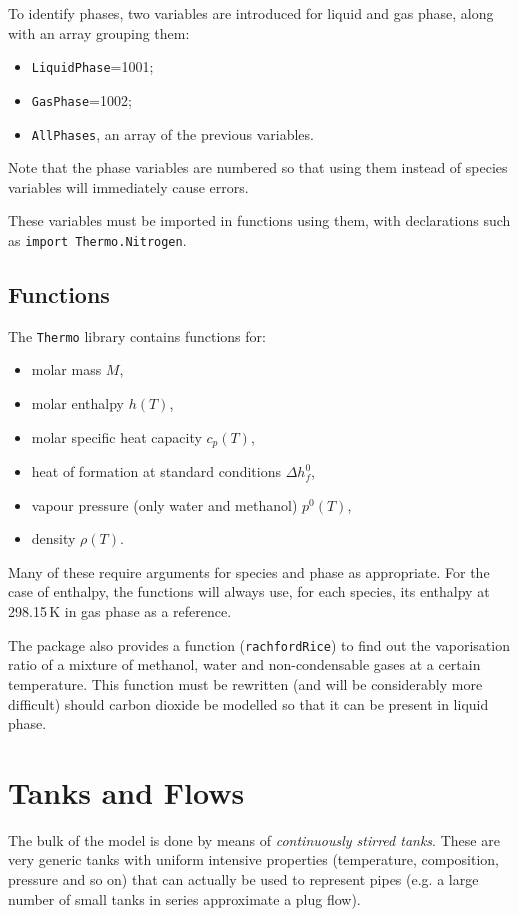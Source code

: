 \documentclass[a4paper]{article}
\begin{document}
To identify phases, two variables are introduced for liquid and gas phase, along
with an array grouping them:

\begin{itemize}
\item \texttt{LiquidPhase}=1001;
\item \texttt{GasPhase}=1002;
\item \texttt{AllPhases}, an array of the previous variables.
\end{itemize}

Note that the phase variables are numbered so that using them instead of species
variables will immediately cause errors.

These variables must be imported in functions using them, with declarations such
as \texttt{import Thermo.Nitrogen}.

\subsection{Functions}
The \texttt{Thermo} library contains functions for:

\begin{itemize}
\item molar mass $M$,
\item molar enthalpy $h(T)$,
\item molar specific heat capacity $c_p(T)$,
\item heat of formation at standard conditions $\Delta h_f^0$,
\item vapour pressure (only water and methanol) $p^0(T)$,
\item density $\rho(T)$.
\end{itemize}

Many of these require arguments for species and phase as appropriate. For the
case of enthalpy, the functions will always use, for each species, its enthalpy
at 298.15\,K in gas phase as a reference.

The package also provides a function (\texttt{rachfordRice}) to find out the
vaporisation ratio of a mixture of methanol, water and non-condensable gases at
a certain temperature. This function must be rewritten (and will be considerably
more difficult) should carbon dioxide be modelled so that it can be present in
liquid phase.

\section{Tanks and Flows}
The bulk of the model is done by means of \emph{continuously stirred tanks}.
These are very generic tanks with uniform intensive properties (temperature,
composition, pressure and so on) that can actually be used to represent pipes
(e.g. a large number of small tanks in series approximate a plug flow).
\end{document}
